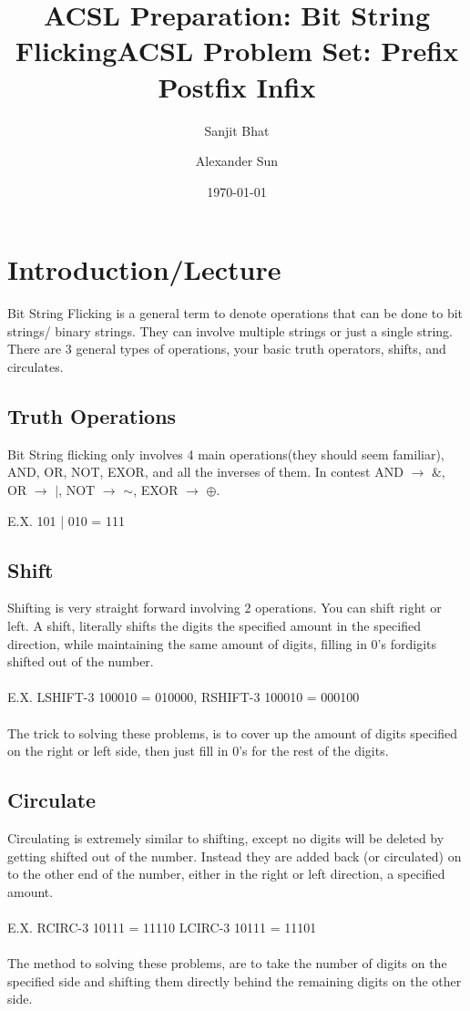 \documentclass{article}
\title{ACSL Preparation: Bit String Flicking}
\author{Sanjit Bhat \and Alexander Sun}
\date{\today}
\begin{document}
\maketitle

\newpage

\begin{center}
    \title{ACSL Problem Set: Prefix Postfix Infix}
\end{center}

\section{Introduction/Lecture}
Bit String Flicking is a general term to denote operations that can be done to bit strings/ binary strings. They can involve multiple strings or just a single string. There are 3 general types of operations, your basic truth operators, shifts, and circulates.
\subsection{Truth Operations}
Bit String flicking only involves 4 main operations(they should seem familiar), AND, OR, NOT, EXOR, and all the inverses of them. In contest AND $\rightarrow$ $\&$, OR $\rightarrow$ $\mid$, NOT $\rightarrow$ $\sim$,  EXOR $\rightarrow$ $\oplus$.

E.X. 101 | 010 = 111
\subsection{Shift}
Shifting is very straight forward involving 2 operations. You can shift right or left. A shift, literally shifts the digits the specified amount in the specified direction, while maintaining the same amount of digits, filling in 0's fordigits shifted out of the number.
\\
\\
E.X. LSHIFT-3 100010 =  010000, RSHIFT-3 100010 = 000100
\\
\\
The trick to solving these problems, is to cover up the amount of digits specified on the right or left side, then just fill in 0's for the rest of the digits.
\subsection{Circulate}
Circulating is extremely similar to shifting, except no digits will be deleted by getting shifted out of the number. Instead they are added back (or circulated) on to the other end of the number, either in the right or left direction, a specified amount.
\\
\\
E.X. RCIRC-3    10111 = 11110         LCIRC-3   10111 = 11101
\\
\\
The method to solving these problems, are to take the number of digits on the specified side and shifting them directly behind the remaining digits on the other side.
\end{document}
